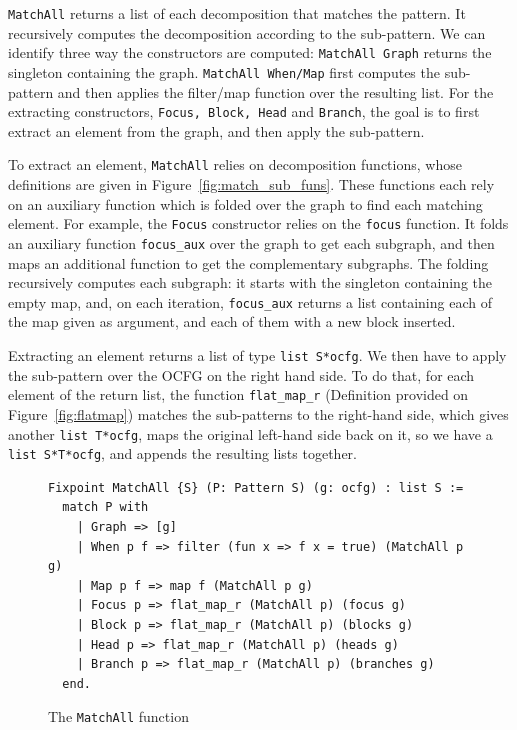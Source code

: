 \documentclass[11pt]{article}
\newcommand{\inlinecoq}[1]{\mbox{\lstinline[style=customcoq,columns=fixed,basewidth=.48em]{#1}}}
\newcommand{\ilc}[1]{\inlinecoq{#1}}
\newcommand{\ocfg}{OCFG\xspace}
\begin{document}
\ilc{MatchAll} returns a list of each decomposition that matches the pattern. It recursively computes the decomposition according to the sub-pattern. We can identify three way the constructors are computed: \ilc{MatchAll Graph} returns the singleton containing the graph. \ilc{MatchAll When/Map} first computes the sub-pattern and then applies the filter/map function over the resulting list. For the extracting constructors, \ilc{Focus, Block, Head} and \ilc{Branch}, the goal is to first extract an element from the graph, and then apply the sub-pattern.

To extract an element, \ilc{MatchAll} relies on decomposition functions, whose definitions are given in Figure~\ref{fig:match_sub_funs}. These functions each rely on an auxiliary function which is folded over the graph to find each matching element. For example, the \ilc{Focus} constructor relies on the \ilc{focus} function. It folds an auxiliary function \ilc{focus_aux} over the graph to get each subgraph, and then maps an additional function to get the complementary subgraphs. The folding recursively computes each subgraph: it starts with the singleton containing the empty map, and, on each iteration, \ilc{focus_aux} returns a list containing each of the map given as argument, and each of them with a new block inserted.

Extracting an element returns a list of type \ilc{list S*ocfg}. We then have to apply the sub-pattern over the \ocfg on the right hand side. To do that, for each element of the return list, the function \ilc{flat_map_r} (Definition provided on Figure~\ref{fig:flatmap}) matches the sub-patterns to the right-hand side, which gives another \ilc{list T*ocfg}, maps the original left-hand side back on it, so we have a \ilc{list S*T*ocfg}, and appends the resulting lists together. 

\begin{figure}
  \label{fig:match}
  \begin{lstlisting}[style=customcoq,basicstyle=\small\ttfamily]
Fixpoint MatchAll {S} (P: Pattern S) (g: ocfg) : list S :=
  match P with
    | Graph => [g]
    | When p f => filter (fun x => f x = true) (MatchAll p g) 
    | Map p f => map f (MatchAll p g)
    | Focus p => flat_map_r (MatchAll p) (focus g)
    | Block p => flat_map_r (MatchAll p) (blocks g)
    | Head p => flat_map_r (MatchAll p) (heads g)
    | Branch p => flat_map_r (MatchAll p) (branches g)
  end.
  \end{lstlisting}
  \caption{The \ilc{MatchAll} function}
  \label{fig:matchall}
\end{figure}
\end{document}
